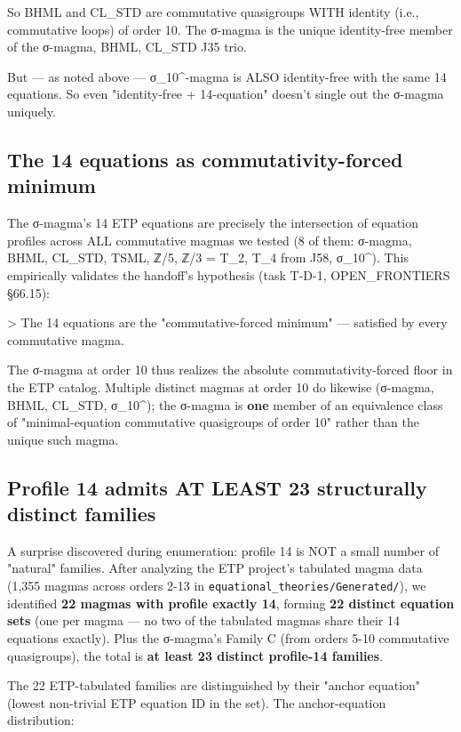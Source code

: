 \documentclass[11pt,reqno]{amsart}
\theoremstyle{plain}
\theoremstyle{definition}
\begin{document}
So BHML and CL_STD are commutative quasigroups WITH identity (i.e., commutative loops) of order 10. The σ-magma is the unique identity-free member of the {σ-magma, BHML, CL_STD} J35 trio.

But --- as noted above --- σ_{10}^{\min}-magma is ALSO identity-free with the same 14 equations. So even "identity-free + 14-equation" doesn't single out the σ-magma uniquely.

\subsection{The 14 equations as commutativity-forced minimum}

The σ-magma's 14 ETP equations are precisely the intersection of equation profiles across ALL commutative magmas we tested (8 of them: σ-magma, BHML, CL_STD, TSML, ℤ/5, ℤ/3 = T_2, T_4 from J58, σ_{10}^{\min}). This empirically validates the handoff's hypothesis (task T-D-1, OPEN_FRONTIERS §66.15):

> The 14 equations are the "commutative-forced minimum" --- satisfied by every commutative magma.

The σ-magma at order 10 thus realizes the absolute commutativity-forced floor in the ETP catalog. Multiple distinct magmas at order 10 do likewise (σ-magma, BHML, CL_STD, σ_{10}^{\min}); the σ-magma is \textbf{one} member of an equivalence class of "minimal-equation commutative quasigroups of order 10" rather than the unique such magma.

\subsection{Profile 14 admits AT LEAST 23 structurally distinct families}

A surprise discovered during enumeration: profile 14 is NOT a small number of "natural" families. After analyzing the ETP project's tabulated magma data (1,355 magmas across orders 2-13 in \texttt{equational_theories/Generated/}), we identified \textbf{22 magmas with profile exactly 14}, forming \textbf{22 distinct equation sets} (one per magma --- no two of the tabulated magmas share their 14 equations exactly). Plus the σ-magma's Family C (from orders 5-10 commutative quasigroups), the total is \textbf{at least 23 distinct profile-14 families}.

The 22 ETP-tabulated families are distinguished by their "anchor equation" (lowest non-trivial ETP equation ID in the set). The anchor-equation distribution:
\end{document}

